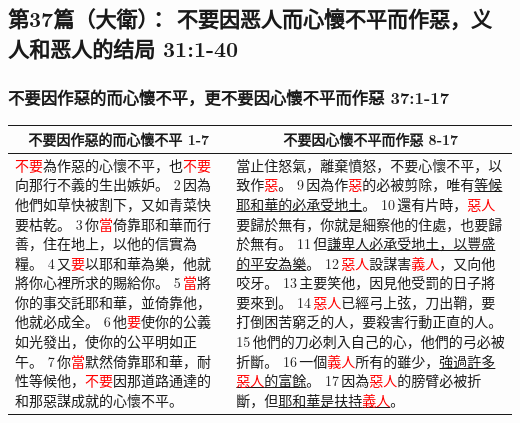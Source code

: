 \subsection{第37篇（大衛）： 不要因恶人而心懷不平而作惡，义人和恶人的结局 31:1-40}

\subsubsection{不要因作惡的而心懷不平，更不要因心懷不平而作惡 37:1-17}
\begin{table}[H]
\centering
\begin{tabular}{p{7cm}|p{10.00cm}}\hline\hline
\multicolumn{1}{c|}{不要因作惡的而心懷不平 1-7}&\multicolumn{1}{c}{不要因心懷不平而作惡 8-17}\\\hline
\textcolor{red}{不要}為作惡的心懷不平，也\textcolor{red}{不要}向那行不義的生出嫉妒。
2 因為他們如草快被割下，又如青菜快要枯乾。
3 你\textcolor{red}{當}倚靠耶和華而行善，住在地上，以他的信實為糧。
4 又\textcolor{red}{要}以耶和華為樂，他就將你心裡所求的賜給你。
5 \textcolor{red}{當}將你的事交託耶和華，並倚靠他，他就必成全。
6 他\textcolor{red}{要}使你的公義如光發出，使你的公平明如正午。
7 你\textcolor{red}{當}默然倚靠耶和華，耐性等候他，\textcolor{red}{不要}因那道路通達的和那惡謀成就的心懷不平。
&當止住怒氣，離棄憤怒，不要心懷不平，以致作\textcolor{red}{惡}。
9 因為作\textcolor{red}{惡}的必被剪除，唯有\underline{等候耶和華的必承受地土}。
10 還有片時，\textcolor{red}{惡人}要歸於無有，你就是細察他的住處，也要歸於無有。
11 但\underline{謙卑人必承受地土，以豐盛的平安為樂}。
12 \textcolor{red}{惡人}設謀害\textcolor{red}{義人}，又向他咬牙。
13 主要笑他，因見他受罰的日子將要來到。
14 \textcolor{red}{惡人}已經弓上弦，刀出鞘，要打倒困苦窮乏的人，要殺害行動正直的人。
15 他們的刀必刺入自己的心，他們的弓必被折斷。
16 一個\textcolor{red}{義人}所有的雖少，\underline{強過許多\textcolor{red}{惡人}的富餘}。
17 因為\textcolor{red}{惡人}的膀臂必被折斷，但\underline{耶和華是扶持\textcolor{red}{義人}}。\\\hline
\end{tabular}
\end{table} 

